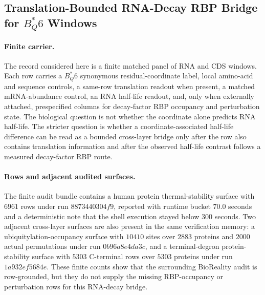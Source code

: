 \subsection{Translation-Bounded RNA-Decay RBP Bridge for $B^*_Q6$ Windows}\label{sec:translation-bounded-rna-decay-rbp-bridge}

\paragraph{Finite carrier.} The record considered here is a finite matched panel of RNA and CDS windows. Each row carries a $B^*_Q6$ synonymous residual-coordinate label, local amino-acid and sequence controls, a same-row translation readout when present, a matched mRNA-abundance control, an RNA half-life readout, and, only when externally attached, prespecified columns for decay-factor RBP occupancy and perturbation state. The biological question is not whether the coordinate alone predicts RNA half-life. The stricter question is whether a coordinate-associated half-life difference can be read as a bounded cross-layer bridge only after the row also contains translation information and after the observed half-life contrast follows a measured decay-factor RBP route.

\paragraph{Rows and adjacent audited surfaces.} The finite audit bundle contains a human protein thermal-stability surface with $6961$ rows under run $8873440304f9$, reported with runtime bucket $70.0$ seconds and a deterministic note that the shell execution stayed below $300$ seconds. Two adjacent cross-layer surfaces are also present in the same verification memory: a ubiquitylation-occupancy surface with $10410$ sites over $2883$ proteins and $2000$ actual permutations under run $0b96a8e4da3c$, and a terminal-degron protein-stability surface with $5303$ C-terminal rows over $5303$ proteins under run $1a932ef5684e$. These finite counts show that the surrounding BioReality audit is row-grounded, but they do not supply the missing RBP-occupancy or perturbation rows for this RNA-decay bridge.

